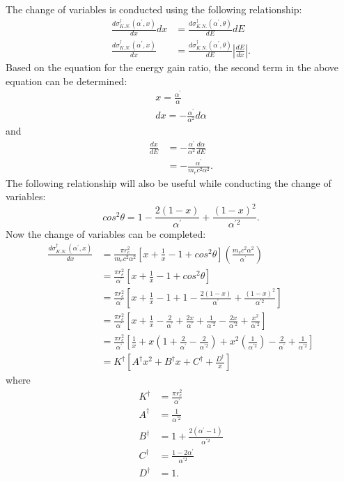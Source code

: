 The change of variables is conducted using the following relationship:
\begin{align}
  \frac{d\sigma_{K.N.}^{\dagger}(\alpha^{'},x)}{dx}dx & =
  \frac{d\sigma_{K.N.}^{\dagger}(\alpha^{'},\theta)}{dE}dE \nonumber \\
  \frac{d\sigma_{K.N.}^{\dagger}(\alpha^{'},x)}{dx} & = 
  \frac{d\sigma_{K.N.}^{\dagger}(\alpha^{'},\theta)}{dE} \left|\frac{dE}{dx}\right|.
  \nonumber
\end{align}
Based on the equation for the energy gain ratio, the second term in the above
equation can be determined:
\begin{align}
  x = \frac{\alpha^{'}}{\alpha} \nonumber \\
  dx = -\frac{\alpha^{'}}{\alpha^2}d\alpha \nonumber
\end{align}
and
\begin{align}
  \frac{dx}{dE} & = -\frac{\alpha^{'}}{\alpha^2}\frac{d\alpha}{dE} \nonumber \\
  & = -\frac{\alpha^{'}}{m_ec^2\alpha^2}.
\end{align}
The following relationship will also be useful while conducting the change
of variables:
\begin{equation}
  cos^2\theta = 1 - \frac{2(1-x)}{\alpha^{'}} + \frac{(1-x)^2}{\alpha^{'2}}.
\end{equation}
Now the change of variables can be completed:
\begin{align}
  \frac{d\sigma_{K.N.}^{\dagger}(\alpha^{'},x)}{dx} & = 
  \frac{\pi r_e^2}{m_ec^2 \alpha^2}\left[x + \frac{1}{x} 
    - 1 + cos^2\theta \right] \left(\frac{m_ec^2\alpha^2}{\alpha^{'}}\right) 
  \nonumber \\
  & = \frac{\pi r_e^2}{\alpha^{'}} \left[x + \frac{1}{x} - 1 + cos^2\theta 
    \right] \\
  & = \frac{\pi r_e^2}{\alpha^{'}} \left[x + \frac{1}{x} - 1 + 1 - 
    \frac{2(1-x)}{\alpha^{'}} + \frac{(1-x)^2}{\alpha^{'2}} \right] \nonumber \\
  & = \frac{\pi r_e^2}{\alpha^{'}} \left[x + \frac{1}{x} - \frac{2}{\alpha^{'}} 
    + \frac{2x}{\alpha^{'}} + \frac{1}{\alpha^{'2}} - \frac{2x}{\alpha^{'2}} + 
    \frac{x^2}{\alpha^{'2}} \right] \nonumber \\
  & = \frac{\pi r_e^2}{\alpha^{'}} \left[\frac{1}{x} + 
    x\left(1 + \frac{2}{\alpha^{'}} - \frac{2}{\alpha^{'2}}\right) +
    x^2\left(\frac{1}{\alpha^{'2}}\right) - \frac{2}{\alpha^{'}} + 
    \frac{1}{\alpha^{'2}} \right] \nonumber \\
  & = K^{\dagger}\left[A^{\dagger}x^2 + B^{\dagger}x + C^{\dagger} + 
    \frac{D^{\dagger}}{x} \right]
\end{align}
where
\begin{align}
  K^{\dagger} & = \frac{\pi r_e^2}{\alpha^{'}} \nonumber \\
  A^{\dagger} & = \frac{1}{\alpha^{'2}} \nonumber \\
  B^{\dagger} & = 1 + \frac{2(\alpha^{'}-1)}{\alpha^{'2}} \nonumber \\
  C^{\dagger} & = \frac{1-2\alpha^{'}}{\alpha^{'2}} \nonumber \\
  D^{\dagger} & = 1. \nonumber
\end{align}
  
